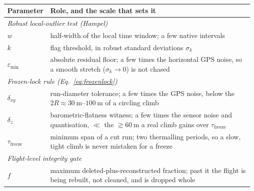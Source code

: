 \begin{table}[htbp]
\centering
\small
\renewcommand{\arraystretch}{1.15}
\begin{tabular}{|l|p{9.4cm}|}
\hline
\textbf{Parameter} & \textbf{Role, and the scale that sets it} \\
\hline
\multicolumn{2}{|l|}{\itshape Robust local-outlier test (Hampel)}\\
\hline
$w$ & half-width of the local time window; a few native intervals \\
\hline
$k$ & flag threshold, in robust standard deviations $\sigma_k$ \\
\hline
$\varepsilon_{\min}$ & absolute residual floor; a few times the
  horizontal GPS noise, so a smooth stretch ($\sigma_k\to0$) is not chased \\
\hline
\multicolumn{2}{|l|}{\itshape Frozen-lock rule (Eq.~\ref{eq:frozenlock})}\\
\hline
$\delta_{xy}$ & run-diameter tolerance; a few times the GPS noise,
  below the $2R\approx\SIrange{30}{100}{\metre}$ of a circling climb \\
\hline
$\delta_z$ & barometric-flatness witness; a few times the
  sensor noise and quantisation, $\ll$ the $\gtrsim\SI{60}{\metre}$ a real climb gains
  over $\tau_{\mathrm{freeze}}$ \\
\hline
$\tau_{\mathrm{freeze}}$ & minimum span of a cut run; two
  thermalling periods, so a slow, tight climb is never mistaken for a freeze \\
\hline
\multicolumn{2}{|l|}{\itshape Flight-level integrity gate}\\
\hline
$f$ & maximum deleted-plus-reconstructed fraction; past it the
  flight is being rebuilt, not cleaned, and is dropped whole \\
\hline
\end{tabular}
\caption{}%
\label{tab:fixlevel-params}
\end{table}

